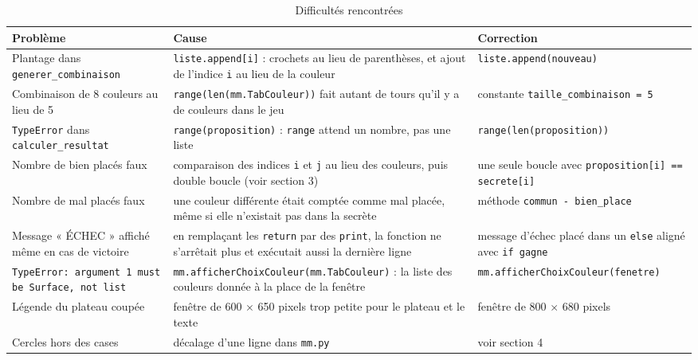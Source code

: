 \documentclass[11pt,a4paper]{article}
\begin{document}
\begin{table}[h]
\centering
\small
\begin{tabular}{p{3.6cm} p{5.6cm} p{4.6cm}}
\toprule
\textbf{Problème} & \textbf{Cause} & \textbf{Correction} \\
\midrule
Plantage dans \texttt{generer\_combinaison}
& \texttt{liste.append[i]} : crochets au lieu de parenthèses, et ajout de l'indice \texttt{i} au lieu de la couleur
& \texttt{liste.append(nouveau)} \\
\addlinespace
Combinaison de 8 couleurs au lieu de 5
& \texttt{range(len(mm.TabCouleur))} fait autant de tours qu'il y a de couleurs dans le jeu
& constante \texttt{taille\_combinaison = 5} \\
\addlinespace
\texttt{TypeError} dans \texttt{calculer\_resultat}
& \texttt{range(proposition)} : \texttt{range} attend un nombre, pas une liste
& \texttt{range(len(proposition))} \\
\addlinespace
Nombre de bien placés faux
& comparaison des indices \texttt{i} et \texttt{j} au lieu des couleurs, puis double boucle (voir section 3)
& une seule boucle avec \texttt{proposition[i] == secrete[i]} \\
\addlinespace
Nombre de mal placés faux
& une couleur différente était comptée comme mal placée, même si elle n'existait pas dans la secrète
& méthode \texttt{commun - bien\_place} \\
\addlinespace
Message « ÉCHEC » affiché même en cas de victoire
& en remplaçant les \texttt{return} par des \texttt{print}, la fonction ne s'arrêtait plus et exécutait aussi la dernière ligne
& message d'échec placé dans un \texttt{else} aligné avec \texttt{if gagne} \\
\addlinespace
\texttt{TypeError: argument 1 must be Surface, not list}
& \texttt{mm.afficherChoixCouleur(mm.TabCouleur)} : la liste des couleurs donnée à la place de la fenêtre
& \texttt{mm.afficherChoixCouleur(fenetre)} \\
\addlinespace
Légende du plateau coupée
& fenêtre de 600 $\times$ 650 pixels trop petite pour le plateau et le texte
& fenêtre de 800 $\times$ 680 pixels \\
\addlinespace
Cercles hors des cases
& décalage d'une ligne dans \texttt{mm.py}
& voir section 4 \\
\bottomrule
\end{tabular}
\caption{Difficultés rencontrées}
\end{table}

\end{document}
